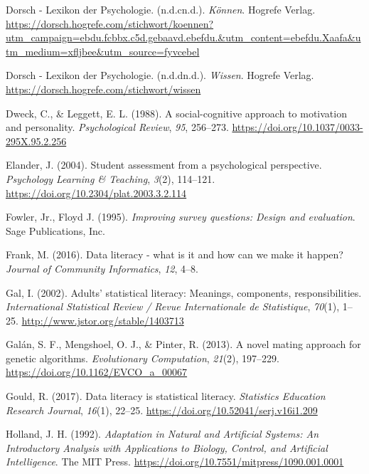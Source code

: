 \documentclass[
  12pt,
  a4paper,
  twoside]{article}
\newlength{\cslhangindent}
\newenvironment{CSLReferences}[2] %
 {\begin{list}{}{%
  \setlength{\itemindent}{0pt}
  \setlength{\leftmargin}{0pt}
  \setlength{\parsep}{0pt}
  \ifodd #1
   \setlength{\leftmargin}{\cslhangindent}
   \setlength{\itemindent}{-1\cslhangindent}
  \fi
  \setlength{\itemsep}{#2\baselineskip}}}
 {\end{list}}
\begin{document}
\begin{CSLReferences}{1}{0}
Dorsch - Lexikon der Psychologie. (n.d.cn.d.). \emph{Können}. Hogrefe Verlag. \url{https://dorsch.hogrefe.com/stichwort/koennen?utm_campaign=ebdu.fcbbx.c5d.gebaavd.ebefdu.&utm_content=ebefdu.Xaafa&utm_medium=xfljbee&utm_source=fyvcebel}

Dorsch - Lexikon der Psychologie. (n.d.dn.d.). \emph{Wissen}. Hogrefe Verlag. \url{https://dorsch.hogrefe.com/stichwort/wissen}

Dweck, C., \& Leggett, E. L. (1988). A social-cognitive approach to motivation and personality. \emph{Psychological Review}, \emph{95}, 256--273. \url{https://doi.org/10.1037/0033-295X.95.2.256}

Elander, J. (2004). Student assessment from a psychological perspective. \emph{Psychology Learning \& Teaching}, \emph{3}(2), 114--121. \url{https://doi.org/10.2304/plat.2003.3.2.114}

Fowler, Jr., Floyd J. (1995). \emph{Improving survey questions: Design and evaluation}. Sage Publications, Inc.

Frank, M. (2016). Data literacy - what is it and how can we make it happen? \emph{Journal of Community Informatics}, \emph{12}, 4--8.

Gal, I. (2002). Adults' statistical literacy: Meanings, components, responsibilities. \emph{International Statistical Review / Revue Internationale de Statistique}, \emph{70}(1), 1--25. \url{http://www.jstor.org/stable/1403713}

Galán, S. F., Mengshoel, O. J., \& Pinter, R. (2013). A novel mating approach for genetic algorithms. \emph{Evolutionary Computation}, \emph{21}(2), 197--229. \url{https://doi.org/10.1162/EVCO_a_00067}

Gould, R. (2017). Data literacy is statistical literacy. \emph{Statistics Education Research Journal}, \emph{16}(1), 22--25. \url{https://doi.org/10.52041/serj.v16i1.209}

Holland, J. H. (1992). \emph{{Adaptation in Natural and Artificial Systems: An Introductory Analysis with Applications to Biology, Control, and Artificial Intelligence}}. The MIT Press. \url{https://doi.org/10.7551/mitpress/1090.001.0001}


\end{CSLReferences}
\end{document}
